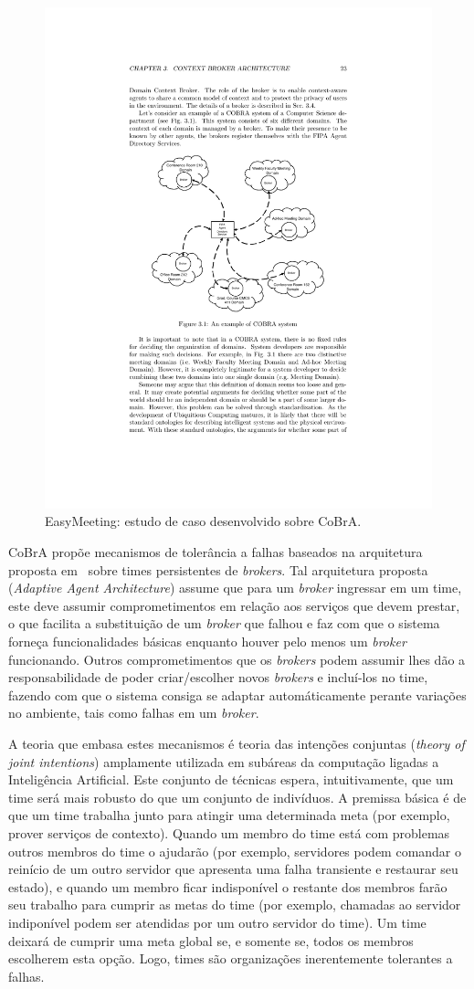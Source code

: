 \begin{figure}[htbp]
	\centering
		\includegraphics[width=.7\textwidth]{figuras/cobra_easy_meeting.pdf}
	\caption{EasyMeeting: estudo de caso desenvolvido sobre CoBrA.}
	\label{fig:_cobra_easy_meeting}
\end{figure}

CoBrA propõe mecanismos de tolerância a falhas baseados na arquitetura proposta em~\cite{kumar2000adaptive} sobre times persistentes de \emph{brokers}. Tal arquitetura proposta (\emph{Adaptive Agent Architecture}) assume que para um \emph{broker} ingressar em um time, este deve assumir comprometimentos em relação aos serviços que devem prestar, o que facilita a substituição de um \emph{broker} que falhou e faz com que o sistema forneça funcionalidades básicas enquanto houver pelo menos um \emph{broker} funcionando. Outros comprometimentos que os \emph{brokers} podem assumir lhes dão a responsabilidade de poder criar/escolher novos \emph{brokers} e incluí-los no time, fazendo com que o sistema consiga se adaptar automáticamente perante variações no ambiente, tais como falhas em um \emph{broker}. 

A teoria que embasa estes mecanismos é teoria das intenções conjuntas (\emph{theory of joint intentions}) amplamente utilizada em subáreas da computação ligadas a Inteligência Artificial. Este conjunto de técnicas espera, intuitivamente, que um time será mais robusto do que um conjunto de indivíduos. A premissa básica é de que um time trabalha junto para atingir uma determinada meta (por exemplo, prover serviços de contexto). Quando um membro do time está com problemas outros membros do time o ajudarão (por exemplo, servidores podem comandar o reinício de um outro servidor que apresenta uma falha transiente e restaurar seu estado), e quando um membro ficar indisponível o restante dos membros farão seu trabalho para cumprir as metas do time (por exemplo, chamadas ao servidor indiponível podem ser atendidas por um outro servidor do time). Um time deixará de cumprir uma meta global se, e somente se, todos os membros escolherem esta opção. Logo, times são organizações inerentemente tolerantes a falhas.

